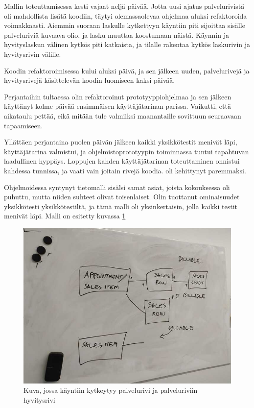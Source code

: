 Mallin toteuttamisessa kesti vajaat neljä päivää. Jotta uusi ajatus
palvelurivistä oli mahdollista lisätä koodiin, täytyi olemassaolevaa
ohjelmaa aluksi refaktoroida voimakkaasti. Aiemmin suoraan laskulle
kytkettyyn käyntiin piti sijoittaa sisälle palveluriviä kuvaava olio, ja
lasku muuttaa koostumaan näistä. Käynnin ja hyvityslaskun välinen kytkös
piti katkaista, ja tilalle rakentaa kytkös laskurivin ja hyvitysrivin
välille.

Koodin refaktoroimisessa kului aluksi päivä, ja sen jälkeen uuden,
palvelurivejä ja hyvitysrivejä käsittelevän koodin luomiseen kaksi
päivää.

Perjantaihin tultaessa olin refaktoroinut prototyyppiohjelmaa ja sen
jälkeen käyttänyt kolme päivää ensimmäisen käyttäjätarinan parissa.
Vaikutti, että aikataulu pettää, eikä mitään tule valmiiksi maanantaille
sovittuun seuraavaan tapaamiseen.

Yllättäen perjantaina puolen päivän jälkeen kaikki yksikkötestit menivät
läpi, käyttäjätarina valmistui, ja ohjelmistoprototyypin toiminnassa
tuntui tapahtuvan laadullinen hyppäys. Loppujen kahden käyttäjätarinan
toteuttaminen onnistui kahdessa tunnissa, ja vaati vain joitain rivejä
koodia.  oli kehittynyt paremmaksi.

Ohjelmoidessa syntynyt tietomalli sisälsi samat asiat, joista
kokouksessa oli puhuttu, mutta niiden suhteet olivat toisenlaiset. Olin
tuottanut ominaisuudet yksikkötesti yksikkötestiltä, ja tämä malli oli
yksinkertaisin, jolla kaikki testit menivät läpi. Malli on esitetty
kuvassa \ref{finalmodel1}

\begin{figure}
\centering
\includegraphics{illustration/final-idea-1.jpg}
\caption{\label{finalmodel1} Kuva, jossa käyntiin kytkeytyy palvelurivi
ja palveluriviin hyvitysrivi}
\end{figure}

